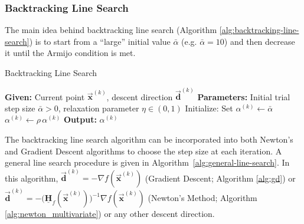 \documentclass[9pt, headings=standardclasses, parskip=half]{scrartcl}
\newcommand{\matr}[1]{\underline{\boldsymbol{#1}}}
\newcommand{\vect}[1]{\vec{\boldsymbol{#1}}}
\begin{document}

\subsubsection{Backtracking Line Search}

The main idea behind backtracking line search (Algorithm \ref{alg:backtracking-line-search}) is to start from a “large” initial value \(\bar{\alpha}\) (e.g. \(\bar{\alpha}=10\)) and then decrease it until the Armijo condition is met.

\begin{algorithm}[h]
\caption{Backtracking Line Search}\label{alg:backtracking-line-search}
\begin{algorithmic}[1]
    \State \textbf{Given:} Current point \(\vect{x}^{(k)}\), descent direction \(\vect{d}^{(k)}\)
    \State \textbf{Parameters:} Initial trial step size \(\bar{\alpha} > 0\), relaxation parameter \(\eta \in (0,1)\)
    \State Initialize: Set \(\alpha^{(k)} \leftarrow \bar{\alpha}\)
        \State \(\alpha^{(k)} \leftarrow \rho\,\alpha^{(k)}\) 
    \EndWhile
    \State \textbf{Output:} \(\alpha^{(k)}\)
\end{algorithmic}
\end{algorithm}

The backtracking line search algorithm can be incorporated into both Newton's and Gradient Descent algorithms to choose the step size at each iteration. 
A general line search procedure is given in Algorithm~\ref{alg:general-line-search}.
In this algorithm, \(\vect{d}^{(k)} = -\nabla f(\vect{x}^{(k)})\) (Gradient Descent; Algorithm \ref{alg:gd}) or \(\vect{d}^{(k)} = -\big(\matr{H}_{f}(\vect{x}^{(k)})\big)^{-1}\nabla f(\vect{x}^{(k)})\) (Newton's Method; Algorithm \ref{alg:newton_multivariate}) or any other descent direction.
\end{document}
